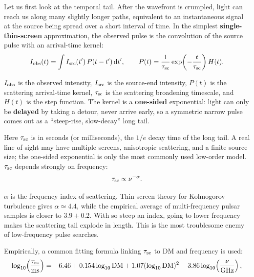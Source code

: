 Let us first look at the temporal tail. After the wavefront is crumpled, light can reach us along many slightly longer paths, equivalent to an instantaneous signal at the source being spread over a short interval of time. In the simplest \textbf{single-thin-screen} approximation, the observed pulse is the convolution of the source pulse with an arrival-time kernel:
\begin{equation}
  I_{\rm obs}(t)
  =
  \int I_{\rm src}(t')\,P(t-t')\,{\rm d}t',
  \qquad
  P(t)=\frac{1}{\tau_{\rm sc}}\exp\!\left(-\frac{t}{\tau_{\rm sc}}\right)H(t).
  \label{eq:e21-scattering-convolution}
\end{equation}
\begin{formulaexplain}
\(I_{\rm obs}\) is the observed intensity, \(I_{\rm src}\) is the source-end intensity, \(P(t)\) is the scattering arrival-time kernel, \(\tau_{\rm sc}\) is the scattering broadening timescale, and \(H(t)\) is the step function. The kernel is a \textbf{one-sided} exponential: light can only be \textbf{delayed} by taking a detour, never arrive early, so a symmetric narrow pulse comes out as a ``steep-rise, slow-decay'' long tail.
\end{formulaexplain}
Here \(\tau_{\rm sc}\) is in seconds (or milliseconds), the \(1/e\) decay time of the long tail. A real line of sight may have multiple screens, anisotropic scattering, and a finite source size; the one-sided exponential is only the most commonly used low-order model. \(\tau_{\rm sc}\) depends strongly on frequency:
\begin{equation}
  \tau_{\rm sc}\propto \nu^{-\alpha}.
  \label{eq:e21-scattering-power}
\end{equation}
\begin{formulaexplain}
\(\alpha\) is the frequency index of scattering. Thin-screen theory for Kolmogorov turbulence gives \(\alpha\simeq4.4\), while the empirical average of multi-frequency pulsar samples is closer to \(3.9\pm0.2\). With so steep an index, going to lower frequency makes the scattering tail explode in length. This is the most troublesome enemy of low-frequency pulse searches.
\end{formulaexplain}
Empirically, a common fitting formula linking \(\tau_{\rm sc}\) to DM and frequency is used:
\begin{equation}
  \log_{10}\!\left(\frac{\tau_{\rm sc}}{{\rm ms}}\right)
  =
  -6.46
  +0.154\log_{10}{\rm DM}
  +1.07(\log_{10}{\rm DM})^2
  -3.86\log_{10}\!\left(\frac{\nu}{\rm GHz}\right),
  \label{eq:e21-bhat-scattering}
\end{equation}
